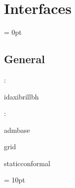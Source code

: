 
\section{Interfaces} 


\parskip = 0pt

\vspace{3mm} \subsection*{General}

: 

idaxibrillbh
\vspace{2mm}

: 

admbase

grid

staticconformal
\vspace{2mm}

\vspace{5mm}\parskip = 10pt 
